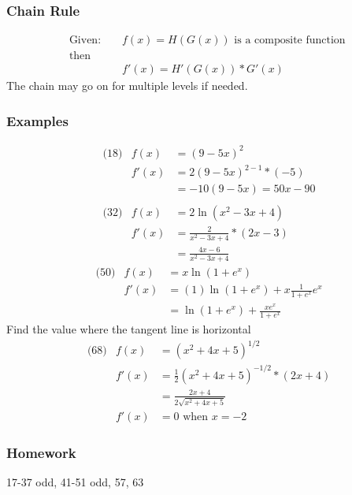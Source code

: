 \documentclass[14pt]{extarticle}
\begin{document}
\subsubsection*{Chain Rule}
\begin{align*}
	&\text{Given: } & &f(x)= H(G(x)) \text{ is a composite function } \\
	&\text{then }\\
	& & &f'(x) = H'(G(x)) * G'(x)
\end{align*}
The chain may go on for multiple levels if needed.

\subsubsection*{Examples}
\begin{align*}
	&\text{(18)} &f(x) &= (9-5x)^2 \\
	&			&f'(x) &= 2(9-5x)^{2-1}*(-5) \\
	&			&    &=-10(9-5x) = 50x - 90  \\\\
	&\text{(32)} &f(x) &= 2 \ln(x^2 - 3x + 4) \\
	&			&f'(x)	&= \frac{2}{x^2-3x+4}*(2x-3) \\
	&	&		&= \frac{4x-6}{x^2-3x+4}
\end{align*}
\begin{align*}
	&\text{(50)} &f(x) &= x \ln(1+e^x)\\
	&			&f'(x) &= (1)\ln(1+e^x) + x\frac{1}{1+e^x}e^x\\
	&			&    &=\ln(1+e^x) + \frac{xe^x}{1+e^x}
\end{align*}
Find the value where the tangent line is horizontal
\begin{align*}
	&\text{(68)} &f(x) &= (x^2 +4x+5)^{1/2} \\
	&			&f'(x)	&= \frac{1}{2}(x^2 +4x+5)^{-1/2}*(2x +4) \\
	&	&		&= \frac{2x +4}{2 \sqrt{x^2 +4x+5}} \\
	&	&		f'(x)&=0 \text{ when } x=-2
\end{align*}

\subsubsection*{Homework}
17-37 odd, 41-51 odd, 57, 63



\cleardoublepage
\end{document}
